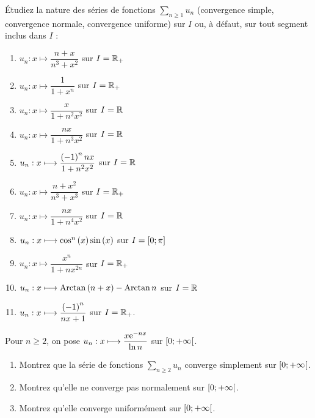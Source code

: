 \begin{exoss}
Étudiez la nature des séries de fonctions \(\sum_{n\geq1}u_n\) (convergence simple, convergence normale, convergence uniforme) sur \(I\) ou, à défaut, sur tout segment inclus dans \(I\) :

\begin{enumerate}
    \item \(u_n:x\mapsto\dfrac{n+x}{n^3+x^2}\) sur \(I=\mathbb{R}_+\) \\
    \item \(u_n:x\mapsto\dfrac{1}{1+x^n}\) sur \(I=\mathbb{R}_+\) \\
    \item \(u_n:x\mapsto\dfrac{x}{1+n^2x^2}\) sur \(I=\mathbb{R}\) \\
    \item \(u_n:x\mapsto\dfrac{nx}{1+n^3x^2}\) sur \(I=\mathbb{R}\) \\
    \item \(u_n:x\longmapsto\dfrac{\left(-1\right)^nnx}{1+n^2x^2}\) sur \(I=\mathbb{R}\) \\
    \item \(u_n:x\mapsto\dfrac{n+x^2}{n^3+x^3}\) sur \(I=\mathbb{R}_+\) \\
    \item \(u_n:x\mapsto\dfrac{nx}{1+n^4x^2}\) sur \(I=\mathbb{R}\) \\
    \item \(u_n:x\longmapsto\cos^n\left(x\right)\sin\left(x\right)\) sur \(I=\left[0;\pi\right]\) \\
    \item \(u_n:x\mapsto\dfrac{x^n}{1+nx^{2n}}\) sur \(I=\mathbb{R}_+\) \\
    \item \(u_n:x\longmapsto\operatorname{Arctan}\left(n+x\right)-\operatorname{Arctan} n\) sur \(I=\mathbb{R}\) \\
    \item \(u_n:x\longmapsto\dfrac{\left(-1\right)^n}{nx+1}\) sur \(I=\mathbb{R}_+\).
\end{enumerate}
\end{exoss}

\begin{exoss}
Pour \(n\geq2\), on pose \(u_n:x\longmapsto\dfrac{x\mathrm{e}^{-nx}}{\ln n}\) sur \(\left[0;+\infty\right[\).

\begin{enumerate}
    \item Montrez que la série de fonctions \(\sum_{n\geq2}u_n\) converge simplement sur \(\left[0;+\infty\right[\). \\
    \item Montrez qu'elle ne converge pas normalement sur \(\left[0;+\infty\right[\). \\
    \item Montrez qu'elle converge uniformément sur \(\left[0;+\infty\right[\).
\end{enumerate}
\end{exoss}

